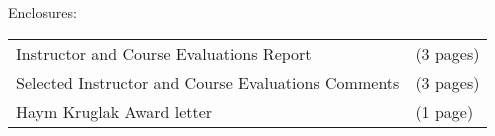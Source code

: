 %
\vspace{2.0\baselineskip}%
{\setlength{\parindent}{0in}
Enclosures:
\vspace{2pt}%
\begin{changemargin}{9pt}
\renewcommand{\arraystretch}{1.0} %
\begin{tabular}{ll}%
Instructor and Course Evaluations Report & (3 pages)\\%
Selected Instructor and Course Evaluations Comments& (3 pages)\\%
Haym Kruglak Award letter & (1 page)\\%
\end{tabular}%
\end{changemargin}
}